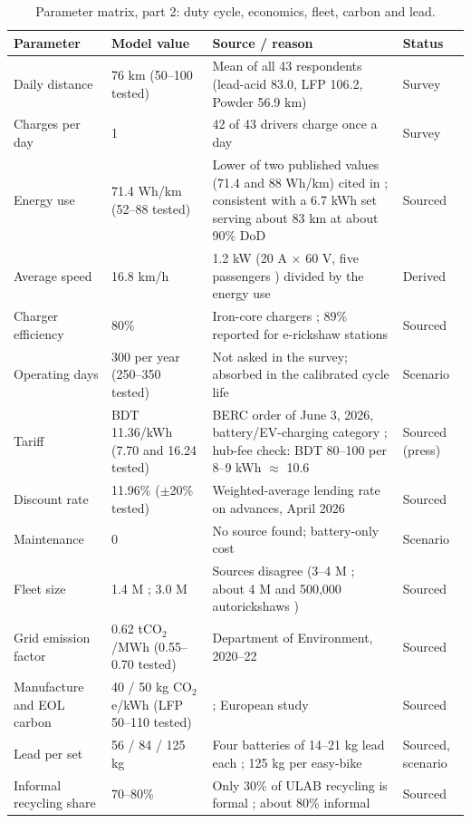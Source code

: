 \documentclass[11pt,a4paper]{article}
\newcommand{\nSurvey}{43}
\newcommand{\kmMeanLA}{83.0}
\newcommand{\kmMeanLFP}{106.2}
\newcommand{\kmMeanPW}{56.9}
\newcommand{\onePerDay}{42}
\newcommand{\packKWh}{6.7}
\newcommand{\kmUsed}{76}
\newcommand{\ekmUsed}{71.4}
\newcommand{\speedUsed}{16.8}
\begin{document}
\begin{table}[t]
\caption{Parameter matrix, part 2: duty cycle, economics, fleet, carbon and lead.}
\label{tab:params2}
\centering\footnotesize
\renewcommand{\arraystretch}{1.1}
\begin{tabular}{p{2.5cm}p{3.3cm}p{6.8cm}p{1.8cm}}
\hline
Parameter & Model value & Source / reason & Status \\
\hline
Daily distance & \kmUsed{} km (50--100 tested) & Mean of all \nSurvey{} respondents (lead-acid \kmMeanLA{}, LFP \kmMeanLFP{}, Powder \kmMeanPW{} km) & Survey \\
Charges per day & 1 & \onePerDay{} of \nSurvey{} drivers charge once a day & Survey \\
Energy use & \ekmUsed{} Wh/km (52--88 tested) & Lower of two published values (71.4 and 88 Wh/km) cited in \cite{peakdemand}; consistent with a \packKWh{} kWh set serving about 83 km at about 90\% DoD & Sourced \\
Average speed & \speedUsed{} km/h & 1.2 kW (20 A $\times$ 60 V, five passengers \cite{chowdhury2026}) divided by the energy use & Derived \\
Charger efficiency & 80\% & Iron-core chargers \cite{chowdhury2026}; 89\% reported for e-rickshaw stations \cite{hasan2020} & Sourced \\
Operating days & 300 per year (250--350 tested) & Not asked in the survey; absorbed in the calibrated cycle life & Scenario \\
Tariff & BDT 11.36/kWh (7.70 and 16.24 tested) & BERC order of June 3, 2026, battery/EV-charging category \cite{berc2026fe,fenews2026}; hub-fee check: BDT 80--100 per 8--9 kWh $\approx$ 10.6 \cite{chowdhury2026} & Sourced (press) \\
Discount rate & 11.96\% ($\pm$20\% tested) & Weighted-average lending rate on advances, April 2026 \cite{ceic_lending} & Sourced \\
Maintenance & 0 & No source found; battery-only cost & Scenario \\
Fleet size & 1.4 M \cite{clean2024}; 3.0 M & Sources disagree (3--4 M \cite{pureearth_smep}; about 4 M and 500{,}000 autorickshaws \cite{unctad_smep}) & Sourced \\
Grid emission factor & 0.62 tCO$_2$/MWh (0.55--0.70 tested) & Department of Environment, 2020--22 \cite{doe_gef} & Sourced \\
Manufacture and EOL carbon & 40 / 50 kg CO$_2$e/kWh (LFP 50--110 tested) & \cite{jasper2025}; European study & Sourced \\
Lead per set & 56 / 84 / 125 kg & Four batteries of 14--21 kg lead each \cite{smep2024}; 125 kg per easy-bike \cite{fe2024,pureearth_smep} & Sourced, scenario \\
Informal recycling share & 70--80\% & Only 30\% of ULAB recycling is formal \cite{fe2024}; about 80\% informal \cite{unctad_smep} & Sourced \\
\hline
\end{tabular}
\end{table}
\end{document}
